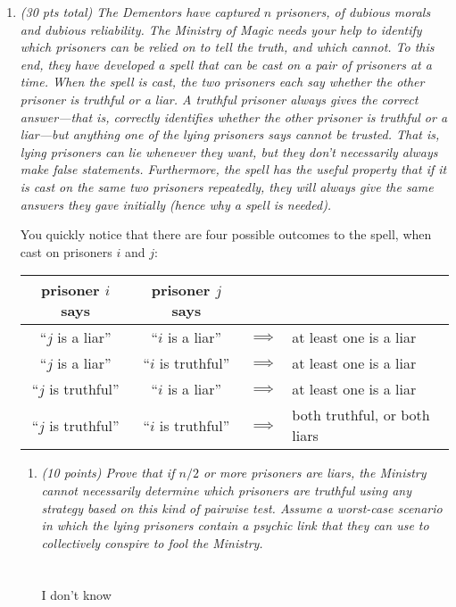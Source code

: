 \documentclass[12pt]{article}
\begin{document}
\begin{enumerate}
	\item {\itshape (30 pts total) 
	The Dementors have captured $n$ prisoners, of dubious morals and dubious reliability. The Ministry of Magic needs your help to identify which prisoners can be relied on to tell the truth, and which cannot. To this end, they have developed a spell that can be cast on a pair of prisoners at a time. When the spell is cast, the two prisoners each say whether the other prisoner is truthful or a liar. A truthful prisoner always gives the correct answer---that is, correctly identifies whether the \emph{other} prisoner is truthful or a liar---but anything one of the lying prisoners says cannot be trusted. That is, lying prisoners can lie whenever they want, but they \emph{don't} necessarily always make false statements. Furthermore, the spell has the useful property that if it is cast on the same two prisoners repeatedly, they will always give the same answers they gave initially (hence why a spell is needed).
	
	You quickly notice that there are four possible outcomes to the spell, when cast on prisoners $i$ and $j$:


	\begin{small}
	\begin{center}
	\begin{tabular}{ccll}
	prisoner $i$ says & prisoner $j$ says & &  \\
	\hline
	``$j$ is a liar'' & ``$i$ is a liar'' & $\implies$ & at least one is a liar \\
	``$j$ is a liar'' & ``$i$ is truthful'' & $\implies$ & at least one is a liar \\
	``$j$ is truthful'' & ``$i$ is a liar'' & $\implies$ & at least one is a liar \\
	``$j$ is truthful'' & ``$i$ is truthful'' & $\implies$ & both truthful, or both liars \\
	\end{tabular}
	\end{center}
	\end{small}}
	
	\begin{enumerate}
	\item {\itshape \label{3a} (10 points) Prove that if $n/2$ or more prisoners are liars, the Ministry cannot necessarily determine which prisoners are truthful using \emph{any} strategy based on this kind of pairwise test. Assume a worst-case scenario in which the lying prisoners contain a psychic link that they can use to collectively conspire to fool the Ministry.}
	\\ \\ \\ I don't know	
	\pagebreak
	

\end{enumerate}
\end{enumerate}
\end{document}
